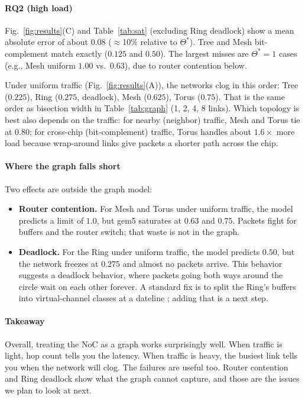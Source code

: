 \documentclass[conference]{IEEEtran}
\begin{document}
\paragraph{RQ2 (high load)}
Fig.~\ref{fig:results}(C) and Table~\ref{tab:sat} (excluding Ring
deadlock) show a mean absolute error of about 0.08
($\approx$10\% relative to $\Theta^{*}$). Tree and Mesh
bit-complement match exactly ($0.125$ and $0.50$). The largest misses
are $\Theta^{*}=1$ cases (e.g., Mesh uniform $1.00$ vs.\ $0.63$), due
to router contention below.

Under uniform traffic (Fig.~\ref{fig:results}(A)), the networks clog
in this order: Tree ($0.225$), Ring ($0.275$, deadlock), Mesh ($0.625$),
Torus ($0.75$). That is the same order as bisection width in
Table~\ref{tab:graph} (1, 2, 4, 8 links). Which topology is best also
depends on the traffic: for nearby (neighbor) traffic, Mesh and Torus tie at $0.80$; for cross-chip (bit-complement) traffic, Torus handles about
$1.6\times$ more load because wrap-around links give packets a shorter
path across the chip.

\paragraph{Where the graph falls short}
Two effects are outside the graph model:
\begin{itemize}
  \item \textbf{Router contention.} For Mesh and Torus under uniform
  traffic, the model predicts a limit of $1.0$, but gem5 saturates at
  $0.63$ and $0.75$. Packets fight for buffers and the router switch;
  that waste is not in the graph.
  \item \textbf{Deadlock.} For the Ring under uniform traffic, the
  model predicts $0.50$, but the network freezes at $0.275$ and almost
  no packets arrive. This behavior suggests a deadlock behavior, where packets going both ways around the circle wait on each other forever. A standard fix is to split the Ring's buffers into virtual-channel classes at a dateline \cite{b6,ocn}; adding that is a
  next step.
\end{itemize}

\paragraph{Takeaway}
Overall, treating the NoC as a graph works surprisingly well. When
traffic is light, hop count tells you the latency. When traffic is
heavy, the busiest link tells you when the network will clog. The
failures are useful too. Router contention and Ring deadlock show what
the graph cannot capture, and those are the issues we plan to look at
next.
\end{document}
